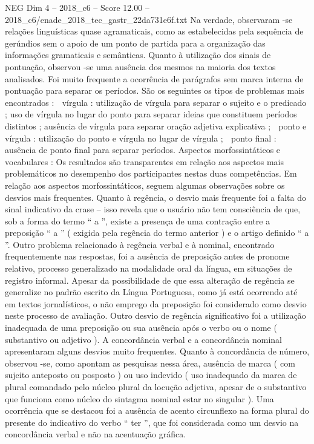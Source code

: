 \begin{textsample}{NEG Dim 4 – 2018\_c6 – Score 12.00 – 2018\_c6/enade\_2018\_tec\_gastr\_22da731e6f.txt}
Na verdade, observaram -se relações linguísticas quase agramaticais, como as estabelecidas pela sequência de gerúndios sem o apoio de um ponto de partida para a organização das informações gramaticais e semânticas.
Quanto à utilização dos sinais de pontuação, observou -se uma ausência dos mesmos na maioria dos textos analisados.
Foi muito frequente a ocorrência de parágrafos sem marca interna de pontuação para separar os períodos.
São os seguintes os tipos de problemas mais encontrados :  vírgula : utilização de vírgula para separar o sujeito e o predicado ; uso de vírgula no lugar do ponto para separar ideias que constituem períodos distintos ; ausência de vírgula para separar oração adjetiva explicativa ;  ponto e vírgula : utilização do ponto e vírgula no lugar de vírgula ;  ponto final : ausência de ponto final para separar períodos.
Aspectos morfossintáticos e vocabulares : Os resultados são transparentes em relação aos aspectos mais problemáticos no desempenho dos participantes nestas duas competências.
Em relação aos aspectos morfossintáticos, seguem algumas observações sobre os desvios mais frequentes.
Quanto à regência, o desvio mais frequente foi a falta do sinal indicativo da crase – isso revela que o usuário não tem consciência de que, sob a forma do termo “ a ”, existe a presença de uma contração entre a preposição “ a ” ( exigida pela regência do termo anterior ) e o artigo definido “ a ”.
Outro problema relacionado à regência verbal e à nominal, encontrado frequentemente nas respostas, foi a ausência de preposição antes de pronome relativo, processo generalizado na modalidade oral da língua, em situações de registro informal.
Apesar da possibilidade de que essa alteração de regência se generalize no padrão escrito da Língua Portuguesa, como já está ocorrendo até em textos jornalísticos, o não emprego da preposição foi considerado como desvio neste processo de avaliação.
Outro desvio de regência significativo foi a utilização inadequada de uma preposição ou sua ausência após o verbo ou o nome ( substantivo ou adjetivo ).
A concordância verbal e a concordância nominal apresentaram alguns desvios muito frequentes.
Quanto à concordância de número, observou -se, como apontam as pesquisas nessa área, ausência de marca ( com sujeito anteposto ou posposto ) ou uso indevido ( uso inadequado da marca de plural comandado pelo núcleo plural da locução adjetiva, apesar de o substantivo que funciona como núcleo do sintagma nominal estar no singular ).
Uma ocorrência que se destacou foi a ausência de acento circunflexo na forma plural do presente do indicativo do verbo “ ter ”, que foi considerada como um desvio na concordância verbal e não na acentuação gráfica.

\end{textsample}
